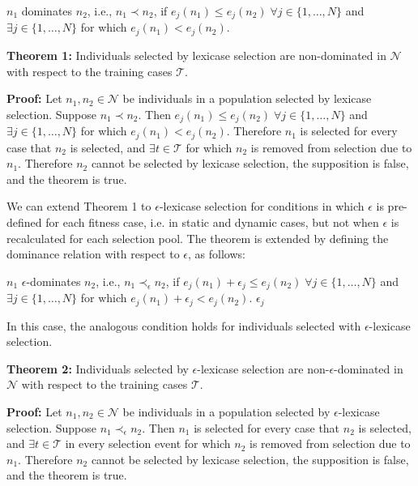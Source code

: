 \documentclass[preprint]{article}
\begin{document}
\medskip
{} $n_1$ dominates $n_2$, i.e., ${n_1} \prec {n_2}$, if $e_j(n_1) \leq e_j(n_2) \;
\forall j  \in \{1,\dots,N\}$ and $\exists j \in \{1,\dots,N\}$ for which $e_j(n_1) < e_j(n_2)$. \bigskip
\bigskip

\medskip
\noindent \textbf{Theorem 1:} Individuals selected by lexicase selection are non-dominated in $\mathcal{N}$ with respect to the training cases $\mathcal{T}$. 
\medskip

\noindent \textbf{Proof:} Let $n_1, n_2 \in \mathcal{N}$ be individuals in a population selected by lexicase selection. Suppose $n_1 \prec n_2$. Then $e_j(n_1) \leq e_j(n_2) \;
\forall j  \in \{1,\dots,N\}$ and $\exists j \in \{1,\dots,N\}$ for which $e_j(n_1) < e_j(n_2)$. Therefore $n_1$ is selected for every case that $n_2$ is selected, and $\exists t \in \mathcal{T}$ for which $n_2$ is removed from selection due to $n_1$. Therefore $n_2$ cannot be selected by lexicase selection, the supposition is false, and the theorem is true. 
\bigskip


We can extend Theorem 1 to $\epsilon$-lexicase selection for conditions in which $\epsilon$ is pre-defined for each fitness case, i.e. in static and dynamic cases, but not when $\epsilon$ is recalculated for each selection pool. The theorem is extended by defining the dominance relation with respect to $\epsilon$, as follows:


\medskip
{} $n_1$ $\epsilon$-dominates $n_2$, i.e., ${n_1} \prec_{\epsilon} {n_2}$, if $e_j(n_1) + \epsilon_j \leq e_j(n_2)  \;
\forall j  \in \{1,\dots,N\}$ and $\exists j \in \{1,\dots,N\}$ for which $e_j(n_1) + \epsilon_j < e_j(n_2) $. $\epsilon_j$\bigskip
\bigskip

In this case, the analogous condition holds for individuals selected with $\epsilon$-lexicase selection. 

\medskip
\noindent \textbf{Theorem 2:} Individuals selected by $\epsilon$-lexicase selection are non-$\epsilon$-dominated in $\mathcal{N}$ with respect to the training cases $\mathcal{T}$. 
\medskip


\noindent \textbf{Proof:} Let $n_1, n_2 \in \mathcal{N}$ be individuals in a population selected by $\epsilon$-lexicase selection. Suppose $n_1 \prec_{\epsilon} n_2$. Then $n_1$ is selected for every case that $n_2$ is selected, and $\exists t \in \mathcal{T}$ in every selection event for which $n_2$ is removed from selection due to $n_1$. Therefore $n_2$ cannot be selected by lexicase selection, the supposition is false, and the theorem is true. 
\bigskip
\end{document}
